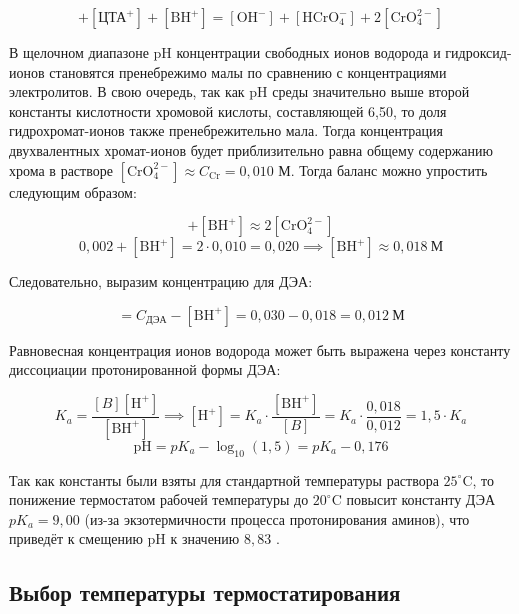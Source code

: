 \begin{equation}
	[\text{H}^+] + [\text{ЦТА}^+] + [\text{BH}^+] = [\text{OH}^-] + [\text{HCrO}_4^-] + 2[\text{CrO}_4^{2-}]
\end{equation}

В щелочном диапазоне pH концентрации свободных ионов водорода и гидроксид-ионов становятся пренебрежимо малы по сравнению с концентрациями электролитов. В свою очередь, так как pH среды значительно выше второй константы кислотности хромовой кислоты, составляющей 6,50, то доля гидрохромат-ионов также пренебрежительно мала. Тогда концентрация двухвалентных хромат-ионов будет приблизительно равна общему содержанию хрома в растворе $[\text{CrO}_4^{2-}] \approx C_{\text{Cr}} = 0{,}010$ М. Тогда баланс можно упростить следующим образом:

\begin{equation}
	[\text{ЦТА}^+] + [\text{BH}^+] \approx 2[\text{CrO}_4^{2-}]
\end{equation}
\begin{equation}
	0{,}002 + [\text{BH}^+] = 2 \cdot 0{,}010 = 0{,}020 \implies [\text{BH}^+] \approx 0{,}018~\text{М}
\end{equation}

Следовательно, выразим концентрацию для ДЭА:

\begin{equation}
	[B] = C_{\text{ДЭА}} - [\text{BH}^+] = 0{,}030 - 0{,}018 = 0{,}012~\text{М}
\end{equation}

Равновесная концентрация ионов водорода может быть выражена через константу диссоциации протонированной формы ДЭА:

\begin{equation}
	K_a = \frac{[B][\text{H}^+]}{[\text{BH}^+]} \implies [\text{H}^+] = K_a \cdot \frac{[\text{BH}^+]}{[B]} = K_a \cdot \frac{0{,}018}{0{,}012} = 1{,}5 \cdot K_a
\end{equation}
\begin{equation}
	\text{pH} = pK_a - \log_{10}(1{,}5) = pK_a - 0{,}176
\end{equation}

Так как константы были взяты для стандартной температуры раствора $25^\circ\text{C}$, то понижение термостатом рабочей температуры до $20^\circ\text{C}$ повысит константу ДЭА $pK_a = 9,00$ (из-за экзотермичности процесса протонирования аминов), что приведёт к смещению pH к значению $8{,}83$ \cite{komarova2006prakticheskoe}.

\subsection{Выбор температуры термостатирования}

